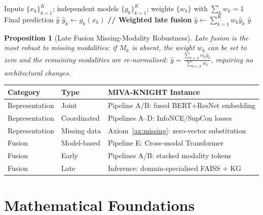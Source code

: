 \documentclass[12pt,a4paper]{article}
\theoremstyle{definition}
\theoremstyle{plain}
\newtheorem{proposition}[theorem]{Proposition}
\theoremstyle{remark}
\begin{document}
\begin{algorithm}[H]
\caption{Model-Agnostic Late Fusion (Weighted Average)}
\label{alg:late_fusion}
\begin{algorithmic}[1]
\Require Inputs $\{x_k\}_{k=1}^K$; independent models $\{g_k\}_{k=1}^K$; weights $\{w_k\}$ with $\sum_k w_k = 1$
\Ensure Final prediction $\hat{y}$
  \State $\hat{y}_k \gets g_k(x_k)$ 
\EndFor
\State \textbf{// Weighted late fusion}
\State $\hat{y} \gets \sum_{k=1}^K w_k \hat{y}_k$
\State \Return $\hat{y}$
\end{algorithmic}
\end{algorithm}

\begin{proposition}[Late Fusion Missing-Modality Robustness]
Late fusion is the most robust to missing modalities: if $M_k$ is absent, the weight $w_k$ can be set to zero and the remaining modalities are re-normalised: $\hat{y} = \frac{\sum_{k \in \mathcal{A}} w_k \hat{y}_k}{\sum_{k \in \mathcal{A}} w_k}$, requiring no architectural changes.
\end{proposition}

\begin{tcolorbox}[taxonomybox,title={Taxonomy Summary for MIVA-KNIGHT}]
\begin{tabular}{lll}
\toprule
\textbf{Category} & \textbf{Type} & \textbf{MIVA-KNIGHT Instance} \\
\midrule
Representation & Joint & Pipeline A/B: fused BERT+ResNet embedding \\
Representation & Coordinated & Pipelines A–D: InfoNCE/SupCon losses \\
Representation & Missing data & Axiom~\ref{ax:missing}: zero-vector substitution \\
Fusion & Model-based & Pipeline E: Cross-modal Transformer \\
Fusion & Early & Pipelines A/B: stacked modality tokens \\
Fusion & Late & Inference: domain-specialised FAISS + KG \\
\bottomrule
\end{tabular}
\end{tcolorbox}

\newpage
\section{Mathematical Foundations}
\label{sec:math}
\end{document}

